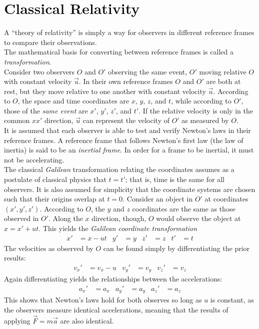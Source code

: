 \documentclass{subfiles}
\begin{document}
	\section{Classical Relativity}
		A \enquote{theory of relativity} is simply a way for observers in different reference frames to compare their observations. \\
		The mathematical basis for converting between reference frames is called a \textit{transformation}. \\
		Consider two observers \(O\) and \(O'\) observing the same event, \(O'\) moving relative \(O\) with constant velocity \(\vec{u}\). In their own reference frames \(O\) and \(O'\) are both at rest, but they move relative to one another with constant velocity \(\vec{u}\). According to \(O\), the space and time coordinates are \(x\), \(y\), \(z\), and \(t\), while according to \(O'\), those of the \textit{same event} are \(x'\), \(y'\), \(z'\), and \(t'\). If the relative velocity is only in the common \(xx'\) direction, \(\vec{u}\) can represent the velocity of \(O'\) as measured by \(O\). \\
		It is assumed that each observer is able to test and verify Newton's laws in their reference frames. A reference frame that follows Newton's first law (the law of inertia) is said to be an \textit{inertial frame}. In order for a frame to be inertial, it must not be accelerating. \\
		The classical \textit{Galilean} transformation relating the coordinates assumes as a postulate of classical physics that \(t = t'\); that is, time is the same for all observers. It is also assumed for simplicity that the coordinate systems are chosen such that their origins overlap at \(t = 0\). Consider an object in \(O'\) at coordinates \((x', y', z')\). According to \(O\), the \(y\) and \(z\) coordinates are the same as those observed in \(O'\). Along the \(x\) direction, though, \(O\) would observe the object at \(x = x' + ut\). This yields the \textit{Galilean coordinate transformation}
			\begin{align*}
				x' &= x - ut &
					y' &= y &
					z' &= z &
					t' &= t
						\tag{Galilean coordinate transformation}	
			\end{align*}
			The velocities as observed by \(O\) can be found simply by differentiating the prior results:
			\begin{align*}
				v_x' &= v_x - u &
					v_y' &= v_y &
					v_z' &= v_z	
						\tag{Galilean velocity transformation}
			\end{align*}
			Again differentiating yields the relationships between the accelerations:
			\begin{align*}
				a_x' &= a_x &
					a_y' &= a_y &	
					a_z' &= a_z
			\end{align*}
			This shows that Newton's laws hold for both observes so long as \(u\) is constant, as the observers measure identical accelerations, meaning that the results of applying \(\vec{F} = m\vec{a}\) are also identical.
	\setcounter{section}{2}
\end{document}
